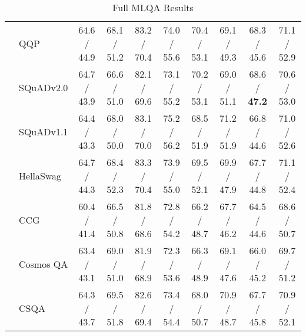 \documentclass[11pt,a4paper]{article}
\begin{document}
\begin{table*}[t!]
{\begin{tabular}{llcccccccc}
& QQP & 64.6 / 44.9 & 68.1 / 51.2 & 83.2 / 70.4 & 74.0 / 55.6 & 70.4 / 53.1 & 69.1 / 49.3 & 68.3 / 45.6 & 71.1 / 52.9 \\
& SQuADv2.0 & 64.7 / 43.9 & 66.6 / 51.0 & 82.1 / 69.6 & 73.1 / 55.2 & 70.2 / 53.1 & 69.0 / 51.1 & 68.6 / {\bf 47.2} & 70.6 / 53.0 \\
& SQuADv1.1 & 64.4 / 43.3 & 68.0 / 50.0 & 83.1 / 70.0 & 75.2 / 56.2 & 68.5 / 51.9 & 71.2 / 51.9 & 66.8 / 44.6 & 71.0 / 52.6 \\
& HellaSwag & 64.7 / 44.3 & 68.4 / 52.3 & 83.3 / 70.4 & 73.9 / 55.0 & 69.5 / 52.1 & 69.9 / 47.9 & 67.7 / 44.8 & 71.1 / 52.4 \\
& CCG & 60.4 / 41.4 & 66.5 / 50.8 & 81.8 / 68.6 & 72.8 / 54.2 & 66.2 / 48.7 & 67.7 / 46.2 & 64.5 / 44.6 & 68.6 / 50.7 \\
& Cosmos QA & 63.4 / 43.1 & 69.0 / 51.0 & 81.9 / 68.9 & 72.3 / 53.6 & 66.3 / 48.9 & 69.1 / 47.6 & 66.0 / 45.2 & 69.7 / 51.2 \\
& CSQA & 64.3 / 43.7 & 69.5 / 51.8 & 82.6 / 69.4 & 73.4 / 54.4 & 68.0 / 50.7 & 70.9 / 48.7 & 67.7 / 45.8 & 70.9 / 52.1 \\
\bottomrule
\end{tabular}
}
\caption{Full MLQA Results}
\label{tab:full_mlqa}
\end{table*}
\end{document}
